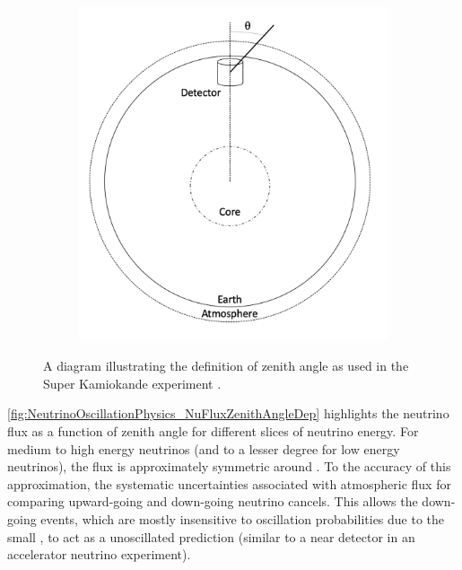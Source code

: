 \begin{figure}[h]
  \begin{subfigure}[t]{0.50\textwidth}
    \includegraphics[width=\textwidth, trim={0mm 0mm 0mm 0mm}, clip,page=1]{Figures/Theory/ZenithAngle.pdf}
  \end{subfigure}
  \caption{A diagram illustrating the definition of zenith angle as used in the Super Kamiokande experiment \cite{Ashie_2005}.}
  \label{fig:NeutrinoOscillationPhysics_ZenithAngle}
\end{figure}

\autoref{fig:NeutrinoOscillationPhysics_NuFluxZenithAngleDep} highlights the neutrino flux as a function of zenith angle for different slices of neutrino energy. For medium to high energy neutrinos (and to a lesser degree for low energy neutrinos), the flux is approximately symmetric around . To the accuracy of this approximation, the systematic uncertainties associated with atmospheric flux for comparing upward-going and down-going neutrino cancels. This allows the down-going events, which are mostly insensitive to oscillation probabilities due to the small , to act as a unoscillated prediction (similar to a near detector in an accelerator neutrino experiment).

